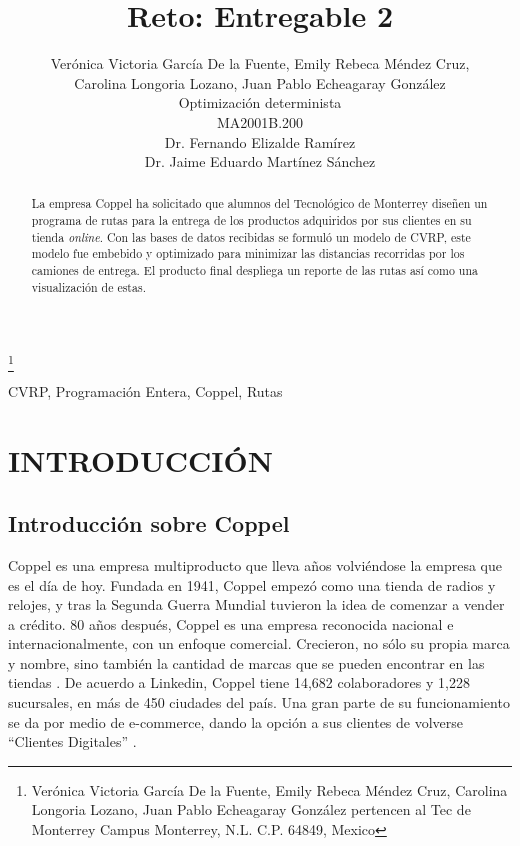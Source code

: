 \documentclass[journal]{IEEEtran}                                                          %
\title{\LARGE \bf Reto: Entregable 2}
\author{Verónica Victoria García De la Fuente, Emily Rebeca Méndez Cruz, \\Carolina Longoria Lozano, Juan Pablo Echeagaray González \\
Optimización determinista \\
MA2001B.200 \\
Dr. Fernando Elizalde Ramírez \\
Dr. Jaime Eduardo Martínez Sánchez}%
\begin{document}
    \thanks{Verónica Victoria García De la Fuente, Emily Rebeca Méndez Cruz, Carolina Longoria Lozano, Juan Pablo Echeagaray González pertencen al Tec de Monterrey Campus Monterrey, N.L. C.P. 64849, Mexico {\tt\small}}

    \maketitle

    \thispagestyle{empty}
    \pagestyle{empty}

    \begin{abstract}
        La empresa Coppel ha solicitado que alumnos del Tecnológico de Monterrey diseñen un programa de rutas para la entrega de los productos adquiridos por sus clientes en su tienda \emph{online}. Con las bases de datos recibidas se formuló un modelo de CVRP, este modelo fue embebido y optimizado para minimizar las distancias recorridas por los camiones de entrega. El producto final despliega un reporte de las rutas así como una visualización de estas.
    \end{abstract}

    \begin{IEEEkeywords} 
    CVRP, Programación Entera, Coppel, Rutas
    \end{IEEEkeywords}

    \section{INTRODUCCIÓN} 
        
        \subsection{Introducción sobre Coppel}
        
            Coppel es una empresa multiproducto que lleva años volviéndose la empresa que es el día de hoy. Fundada en 1941, Coppel empezó como una tienda de radios y relojes, y tras la Segunda Guerra Mundial tuvieron la idea de comenzar a vender a crédito. 80 años después, Coppel es una empresa reconocida nacional e internacionalmente, con un enfoque comercial. Crecieron, no sólo su propia marca y nombre, sino también la cantidad de marcas que se pueden encontrar en las tiendas \cite{Coppel}. De acuerdo a Linkedin, Coppel tiene 14,682 colaboradores y 1,228 sucursales, en más de 450 ciudades del país. Una gran parte de su funcionamiento se da por medio de e-commerce, dando la opción a sus clientes de volverse “Clientes Digitales” \cite{linkedin_2022}.
    
\end{document}
